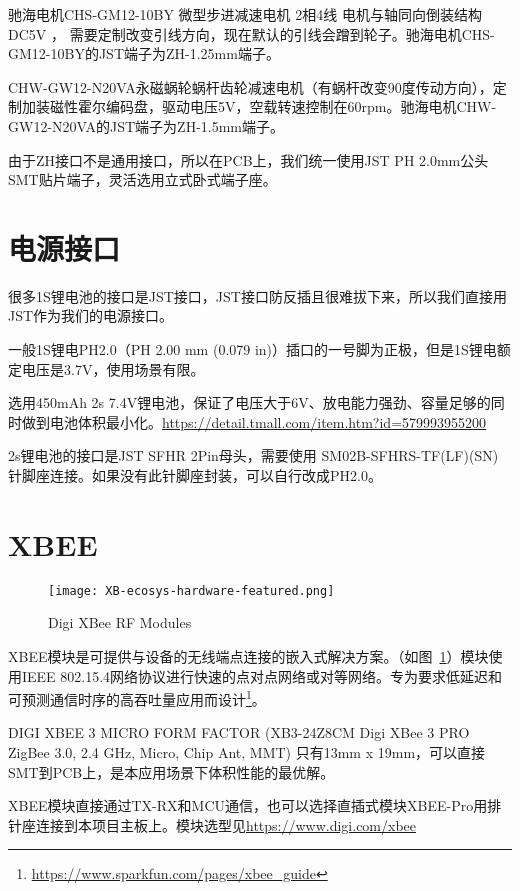 驰海电机CHS-GM12-10BY 微型步进减速电机 2相4线 电机与轴同向倒装结构 DC5V ， 需要定制改变引线方向，现在默认的引线会蹭到轮子。驰海电机CHS-GM12-10BY的JST端子为ZH-1.25mm端子。

CHW-GW12-N20VA永磁蜗轮蜗杆齿轮减速电机（有蜗杆改变90度传动方向），定制加装磁性霍尔编码盘，驱动电压5V，空载转速控制在60rpm。驰海电机CHW-GW12-N20VA的JST端子为ZH-1.5mm端子。

由于ZH接口不是通用接口，所以在PCB上，我们统一使用JST PH 2.0mm公头SMT贴片端子，灵活选用立式卧式端子座。

\section{电源接口}

很多1S锂电池的接口是JST接口，JST接口防反插且很难拔下来，所以我们直接用JST作为我们的电源接口。

一般1S锂电PH2.0（PH 2.00 mm (0.079 in)）插口的一号脚为正极，但是1S锂电额定电压是3.7V，使用场景有限。

选用450mAh 2s 7.4V锂电池，保证了电压大于6V、放电能力强劲、容量足够的同时做到电池体积最小化。\url{https://detail.tmall.com/item.htm?id=579993955200}

2s锂电池的接口是JST SFHR 2Pin母头，需要使用 SM02B-SFHRS-TF(LF)(SN) 针脚座连接。如果没有此针脚座封装，可以自行改成PH2.0。


\section{XBEE}

\begin{figure}[htbp]
    \centering
    \texttt{[image: XB-ecosys-hardware-featured.png]}
    \caption{Digi XBee RF Modules}
    \label{fig:XB}
\end{figure}

XBEE模块是可提供与设备的无线端点连接的嵌入式解决方案。（如图~\ref{fig:XB}）模块使用IEEE 802.15.4网络协议进行快速的点对点网络或对等网络。专为要求低延迟和可预测通信时序的高吞吐量应用而设计\footnote{\url{https://www.sparkfun.com/pages/xbee_guide}}。

DIGI XBEE 3 MICRO FORM FACTOR (XB3-24Z8CM  Digi XBee 3 PRO ZigBee 3.0, 2.4 GHz, Micro, Chip Ant, MMT) 只有13mm x 19mm，可以直接SMT到PCB上，是本应用场景下体积性能的最优解。

XBEE模块直接通过TX-RX和MCU通信，也可以选择直插式模块XBEE-Pro用排针座连接到本项目主板上。模块选型见\url{https://www.digi.com/xbee}

